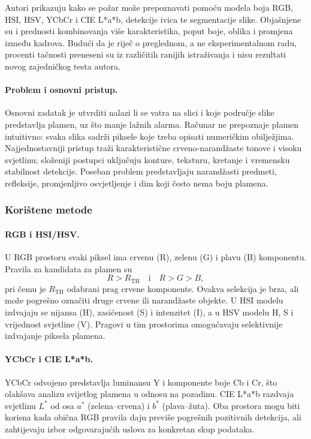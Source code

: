 Autori prikazuju kako se požar može prepoznavati pomoću modela boja RGB, HSI, HSV, YCbCr i CIE L*a*b, detekcije ivica te segmentacije slike. Objašnjene su i prednosti kombinovanja više karakteristika, poput boje, oblika i promjena između kadrova. Budući da je riječ o preglednom, a ne eksperimentalnom radu, procenti tačnosti preneseni su iz različitih ranijih istraživanja i nisu rezultati novog zajedničkog testa autora.

\paragraph{Problem i osnovni pristup.} Osnovni zadatak je utvrditi nalazi li se vatra na slici i koje područje slike predstavlja plamen, uz što manje lažnih alarma. Računar ne prepoznaje plamen intuitivno: svaka slika sadrži piksele koje treba opisati numeričkim obilježjima. Najjednostavniji pristup traži karakteristične crveno-narandžaste tonove i visoku svjetlinu; složeniji postupci uključuju konture, teksturu, kretanje i vremensku stabilnost detekcije. Poseban problem predstavljaju narandžasti predmeti, refleksije, promjenljivo osvjetljenje i dim koji često nema boju plamena.

\subsubsection{Korištene metode}
\paragraph{RGB i HSI/HSV.} U RGB prostoru svaki piksel ima crvenu (R), zelenu (G) i plavu (B) komponentu. Pravila za kandidata za plamen su
\begin{equation}
R > R_{\mathrm{TH}} \quad\text{i}\quad R > G > B,
\end{equation}
pri čemu je $R_{\mathrm{TH}}$ odabrani prag crvene komponente. Ovakva selekcija je brza, ali može pogrešno označiti druge crvene ili narandžaste objekte. U HSI modelu izdvajaju se nijansa (H), zasićenost (S) i intenzitet (I), a u HSV modelu H, S i vrijednost svjetline (V). Pragovi u tim prostorima omogućavaju selektivnije izdvajanje piksela plamena.

\paragraph{YCbCr i CIE L*a*b.} YCbCr odvojeno predstavlja luminansu Y i komponente boje Cb i Cr, što olakšava analizu svijetlog plamena u odnosu na pozadinu. CIE L*a*b razdvaja svjetlinu $L^{*}$ od osa $a^{*}$ (zelena--crvena) i $b^{*}$ (plava--žuta). Oba prostora mogu biti korisna kada obična RGB pravila daju previše pogrešnih pozitivnih detekcija, ali zahtijevaju izbor odgovarajućih uslova za konkretan skup podataka.

